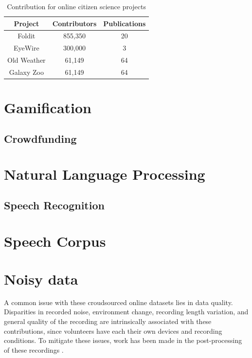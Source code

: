 \begin{table}[h]
    \centering
    \begin{tabular}{|c|c|c|}
        \hline Project & Contributors & Publications \\
        \hline Foldit & 855,350 \cite{foldit2021players} & 20 \cite{foldit2021publications} \\ 
        \hline EyeWire & 300,000 \cite{eyewire2017players} & 3 \cite{eyewire2021publications} \\ 
        \hline Old Weather & 61,149 \cite{galaxyzoo2021players} & 64 \cite{galaxyzoo2021publications} \\ 
        \hline Galaxy Zoo & 61,149 \cite{galaxyzoo2021players} & 64 \cite{galaxyzoo2021publications} \\ 
        \hline 
    \end{tabular}
    \caption{Contribution for online citizen science projects}
    \label{tab:cs-contributions}
\end{table}

\section{Gamification}

\subsection{Crowdfunding}

\section{Natural Language Processing}

\subsection{Speech Recognition}

\section{Speech Corpus}

\section{Noisy data}

A common issue with these croudsourced online datasets lies in data quality. Disparities in recorded noise, environment change, recording length variation, and general quality of the recording are intrinsically associated with these contributions, since volunteers have each their own devices and recording conditions. To mitigate these issues, work has been made in the post-processing of these recordings \cite{krishna2019speech}.

